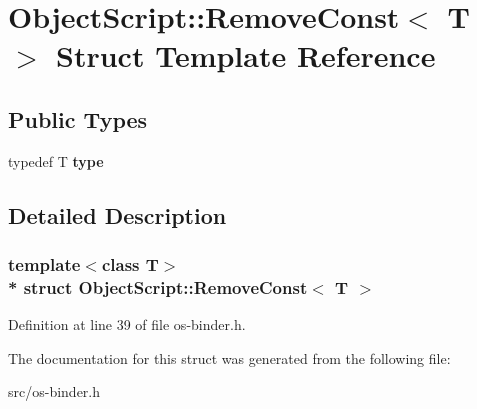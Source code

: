 \hypertarget{struct_object_script_1_1_remove_const}{}\section{Object\+Script\+:\+:Remove\+Const$<$ T $>$ Struct Template Reference}
\label{struct_object_script_1_1_remove_const}
\subsection*{Public Types}
\begin{DoxyCompactItemize}
\item 
typedef T {\bfseries type}\hypertarget{struct_object_script_1_1_remove_const_a4ec98121a0229da3ad62ebdcc10218c6}{}\label{struct_object_script_1_1_remove_const_a4ec98121a0229da3ad62ebdcc10218c6}

\end{DoxyCompactItemize}


\subsection{Detailed Description}
\subsubsection*{template$<$class T$>$\\*
struct Object\+Script\+::\+Remove\+Const$<$ T $>$}



Definition at line 39 of file os-\/binder.\+h.



The documentation for this struct was generated from the following file\+:\begin{DoxyCompactItemize}
\item 
src/os-\/binder.\+h\end{DoxyCompactItemize}
